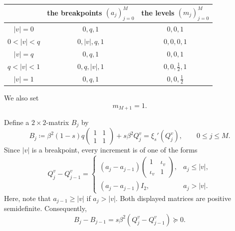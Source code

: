 \documentclass[11pt]{article}
\numberwithin{equation}{section}
\newcommand{\1}{\mathbf 1}
\begin{document}
\begin{center}
\begin{tabular}{|c||c|c|}
\hline
& the  breakpoints  $(a_j)_{j=0}^M$ & the levels $(m_j)_{j=0}^{M}$ \\[1mm]
\hline
$|v|=0$ & $0,q,1$ & $0,0,1$\\[1mm]
\hline
$0<|v|<q$ & $0,|v|,q,1$ & $0,0,0,1$ \\[1mm]
\hline
$|v|=q$ & $0,q,1$ & $0,0,1$ \\[1mm]
\hline 
$q<|v|<1$ & $0,q,|v|,1$ & $0,0,\frac12,1$ \\[1mm]
\hline
$|v|=1$ & $0,q,1$ & $0,0,\frac12$\\[1mm]
\hline
\end{tabular}
\end{center}
We also set
\[
m_{M+1}=1.
\]


Define a $2\times 2$-matrix $B_j$ by
\begin{equation}\label{eq:defB}
 B_j\coloneqq\beta^2(1-s)q
 \begin{pmatrix}1&1\\1&1\end{pmatrix}
 +s\beta^2Q_j^v
 =\xi_s'(Q_j^v),
 \qquad 0\le j\le M.
\end{equation}
Since $|v|$ is a breakpoint, every increment is of one of the forms
\begin{equation}
 Q_j^v-Q_{j-1}^v=
 \begin{cases}
 (a_j-a_{j-1})
 \begin{pmatrix}1&\iota_v\\\iota_v&1\end{pmatrix},&a_j\le |v|,\\[3mm]
 (a_j-a_{j-1})I_2,&a_{j}> |v|.
 \end{cases}
 \label{eq:GT-overlap-increments}
\end{equation}
Here, note that $a_{j-1} \geq |v|$ if $a_j >|v|$.
Both displayed matrices are positive semidefinite.  Consequently,
\begin{equation}\label{eq:finite-step-vector-increments}
 B_j-B_{j-1}=s\beta^2(Q_j^v-Q_{j-1}^v)\succeq0.
\end{equation}
\end{document}
